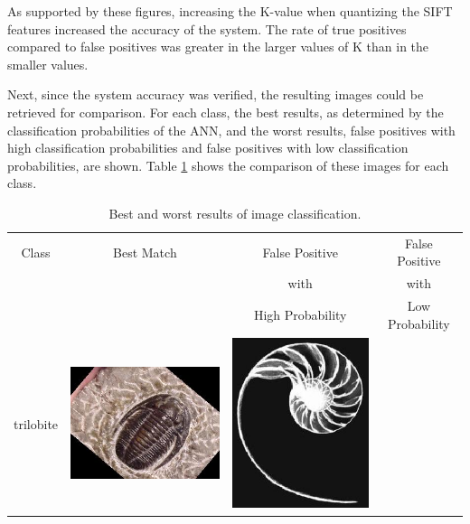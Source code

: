\documentclass{article}
\begin{document}
As supported by these figures, increasing the K-value when quantizing the SIFT features increased the accuracy of the system. The rate of true positives compared to false positives was greater in the larger values of K than in the smaller values.

Next, since the system accuracy was verified, the resulting images could be retrieved for comparison. For each class, the best results, as determined by the classification probabilities of the ANN, and the worst results, false positives with high classification probabilities and false positives with low classification probabilities, are shown. Table \ref{tab:results} shows the comparison of these images for each class.

\begin{table}[Ht]
\caption{Best and worst results of image classification.}
\label{tab:results}
\begin{tabular}{| c | c | c | c |}
\hline
Class & Best Match & False Positive & False Positive \\
 & & with & with \\
 & & High Probability & Low Probability \\
\hline
trilobite &
\vspace{0cm}\includegraphics[scale=.15]{"Figures/Best Matches/bestmatch_c1"} &
\vspace{0cm}\includegraphics[scale=.15]{"Figures/False Matches/class_1_most_sure_wrong"} &

\end{tabular}
\end{table}
\end{document}
